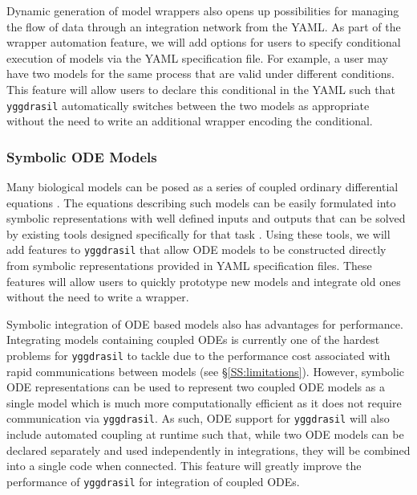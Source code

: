 \documentclass[journal]{IEEEtran}
\newcommand{\pkg}{{\tt yggdrasil}{}}
\begin{document}
Dynamic generation of model wrappers also opens up possibilities for managing the flow of data through an integration network from the YAML. As part of the wrapper automation feature, we will add options for users to specify conditional execution of models via the YAML specification file. For example, a user may have two models for the same process that are valid under different conditions. This feature will allow users to declare this conditional in the YAML such that {\pkg} automatically switches between the two models as appropriate without the need to write an additional wrapper encoding the conditional.


\subsubsection{Symbolic ODE Models}\label{SS:ODE}
%
Many biological models can be posed as a series of coupled ordinary differential equations \citep[ODEs, ][]{WANG2015}. The equations describing such models can be easily formulated into symbolic representations \citep[e.g. SymPy][]{Meurer2017} with well defined inputs and outputs that can be solved by existing tools designed specifically for that task \citep[e.g. scipy.integrate.ode][]{Jones2001, Hairer1993}. Using these tools, we will add features to {\pkg} that allow ODE models to be constructed directly from symbolic representations provided in YAML specification files. These features will allow users to quickly prototype new models and integrate old ones without the need to write a wrapper.

Symbolic integration of ODE based models also has advantages for performance. Integrating models containing coupled ODEs is currently one of the hardest problems for {\pkg} to tackle due to the performance cost associated with rapid communications between models (see \S\ref{SS:limitations}). However, symbolic ODE representations can be used to represent two coupled ODE models as a single model which is much more computationally efficient as it does not require communication via {\pkg}. As such, ODE support for {\pkg} will also include automated coupling at runtime such that, while two ODE models can be declared separately and used independently in integrations, they will be combined into a single code when connected. This feature will greatly improve the performance of {\pkg} for integration of coupled ODEs.

\end{document}
